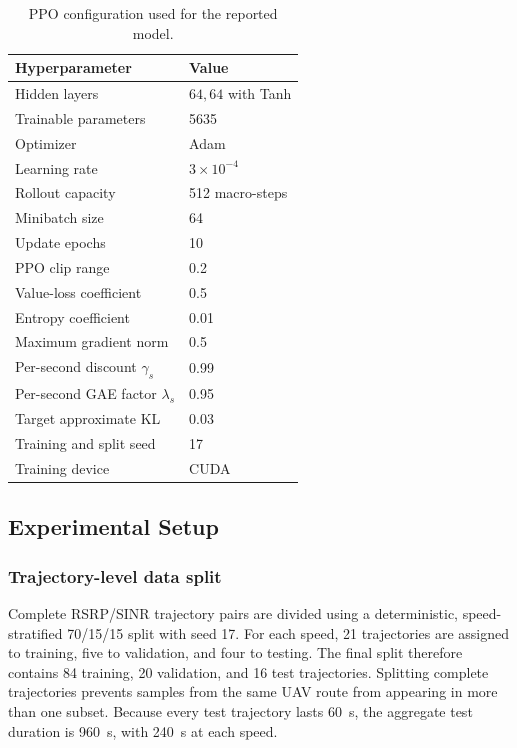 \begin{table}[t]
\centering
\caption{PPO configuration used for the reported model.}
\label{tab:ppo-configuration}
\begin{tabular}{@{}ll@{}}
\toprule
Hyperparameter & Value \\
\midrule
Hidden layers & $64,64$ with Tanh \\
Trainable parameters & 5635 \\
Optimizer & Adam \\
Learning rate & $3\times10^{-4}$ \\
Rollout capacity & 512 macro-steps \\
Minibatch size & 64 \\
Update epochs & 10 \\
PPO clip range & 0.2 \\
Value-loss coefficient & 0.5 \\
Entropy coefficient & 0.01 \\
Maximum gradient norm & 0.5 \\
Per-second discount $\gamma_s$ & 0.99 \\
Per-second GAE factor $\lambda_s$ & 0.95 \\
Target approximate KL & 0.03 \\
Training and split seed & 17 \\
Training device & CUDA \\
\bottomrule
\end{tabular}
\end{table}

\subsection{Experimental Setup}
\label{subsec:experimental-setup}

\subsubsection{Trajectory-level data split}

Complete RSRP/SINR trajectory pairs are divided using a deterministic,
speed-stratified 70/15/15 split with seed 17. For each speed, 21 trajectories
are assigned to training, five to validation, and four to testing. The final
split therefore contains 84 training, 20 validation, and 16 test trajectories.
Splitting complete trajectories prevents samples from the same UAV route from
appearing in more than one subset. Because every test trajectory lasts 60~s,
the aggregate test duration is 960~s, with 240~s at each speed.

